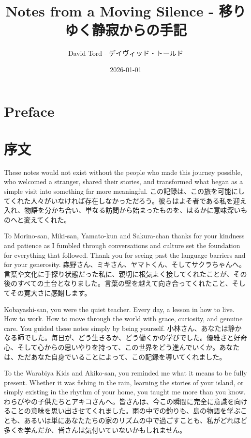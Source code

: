 \documentclass[
  letterpaper,
  oneside]{scrbook}
\title{Notes from a Moving Silence - 移りゆく静寂からの手記}
\author{David Tord - デイヴィッド・トールド}
\date{2026-01-01}
\begin{document}
\frontmatter
\maketitle


\mainmatter
{}

\chapter{Preface}\label{preface}


\chapter{序文}\label{ux5e8fux6587}

These notes would not exist without the people who made this journey
possible, who welcomed a stranger, shared their stories, and transformed
what began as a simple visit into something far more meaningful.
この記録は、この旅を可能にしてくれた人々がいなければ存在しなかっただろう。彼らはよそ者である私を迎え入れ、物語を分かち合い、単なる訪問から始まったものを、はるかに意味深いものへと変えてくれた。

To Morino-san, Miki-san, Yamato-kun and Sakura-chan thanks for your
kindness and patience as I fumbled through conversations and culture set
the foundation for everything that followed. Thank you for seeing past
the language barriers and for your generosity.
森野さん、ミキさん、ヤマトくん、そしてサクラちゃんへ。言葉や文化に手探り状態だった私に、親切に根気よく接してくれたことが、その後のすべての土台となりました。言葉の壁を越えて向き合ってくれたこと、そしてその寛大さに感謝します。

Kobayashi-san, you were the quiet teacher. Every day, a lesson in how to
live. How to work. How to move through the world with grace, curiosity,
and genuine care. You guided these notes simply by being yourself.
小林さん、あなたは静かなる師でした。毎日が、どう生きるか、どう働くかの学びでした。優雅さと好奇心、そして心からの思いやりを持って、この世界をどう進んでいくか。あなたは、ただあなた自身でいることによって、この記録を導いてくれました。

To the Warabiya Kids and Akiko-san, you reminded me what it means to be
fully present. Whether it was fishing in the rain, learning the stories
of your island, or simply existing in the rhythm of your home, you
taught me more than you know.
わらびやの子供たちとアキコさんへ。皆さんは、今この瞬間に完全に意識を向けることの意味を思い出させてくれました。雨の中での釣りも、島の物語を学ぶことも、あるいは単にあなたたちの家のリズムの中で過ごすことも、私がどれほど多くを学んだか、皆さんは気付いていないかもしれません。
\end{document}
